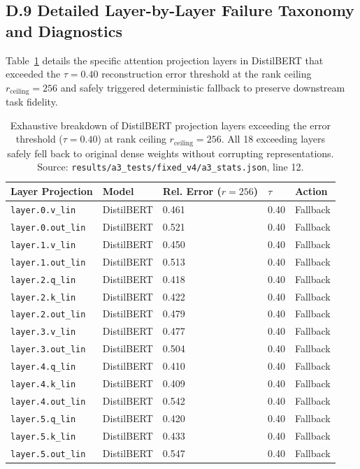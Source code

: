 \subsection{D.9 Detailed Layer-by-Layer Failure Taxonomy and Diagnostics}
\label{sec:app_failure_taxonomy}

Table~\ref{tab:app_failure_cases} details the specific attention projection layers in DistilBERT that exceeded the $\tau=0.40$ reconstruction error threshold at the rank ceiling $r_{\mathrm{ceiling}}=256$ and safely triggered deterministic fallback to preserve downstream task fidelity.

\begin{table}[H]
\centering
\scriptsize
\setlength{\tabcolsep}{3pt}
\begin{tabular}{p{}p{}p{}p{}p{}}
\toprule
\textbf{Layer Projection} & \textbf{Model} & \textbf{Rel. Error ($r=256$)} & \textbf{$\tau$} & \textbf{Action} \\
\midrule
\texttt{layer.0.v\_lin} & DistilBERT & 0.461 & 0.40 & Fallback \\
\texttt{layer.0.out\_lin} & DistilBERT & 0.521 & 0.40 & Fallback \\
\texttt{layer.1.v\_lin} & DistilBERT & 0.450 & 0.40 & Fallback \\
\texttt{layer.1.out\_lin} & DistilBERT & 0.513 & 0.40 & Fallback \\
\texttt{layer.2.q\_lin} & DistilBERT & 0.418 & 0.40 & Fallback \\
\texttt{layer.2.k\_lin} & DistilBERT & 0.422 & 0.40 & Fallback \\
\texttt{layer.2.out\_lin} & DistilBERT & 0.479 & 0.40 & Fallback \\
\texttt{layer.3.v\_lin} & DistilBERT & 0.477 & 0.40 & Fallback \\
\texttt{layer.3.out\_lin} & DistilBERT & 0.504 & 0.40 & Fallback \\
\texttt{layer.4.q\_lin} & DistilBERT & 0.410 & 0.40 & Fallback \\
\texttt{layer.4.k\_lin} & DistilBERT & 0.409 & 0.40 & Fallback \\
\texttt{layer.4.out\_lin} & DistilBERT & 0.542 & 0.40 & Fallback \\
\texttt{layer.5.q\_lin} & DistilBERT & 0.420 & 0.40 & Fallback \\
\texttt{layer.5.k\_lin} & DistilBERT & 0.433 & 0.40 & Fallback \\
\texttt{layer.5.out\_lin} & DistilBERT & 0.547 & 0.40 & Fallback \\
\bottomrule
\end{tabular}
\caption{Exhaustive breakdown of DistilBERT projection layers exceeding the error threshold ($\tau = 0.40$) at rank ceiling $r_{\mathrm{ceiling}}=256$. All 18 exceeding layers safely fell back to original dense weights without corrupting representations. Source: \texttt{results/a3\_tests/fixed\_v4/a3\_stats.json}, line 12.}
\label{tab:app_failure_cases}
\end{table}


